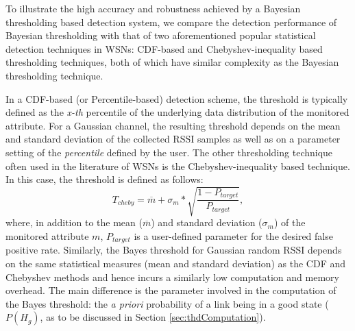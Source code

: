 
To illustrate the high accuracy and robustness achieved by a Bayesian thresholding based detection system,  we compare the detection performance of Bayesian thresholding with that of two aforementioned popular statistical detection techniques in WSNs: CDF-based and Chebyshev-inequality based thresholding techniques, both of which have similar complexity as the Bayesian thresholding technique.  

In a CDF-based (or Percentile-based) detection scheme, the threshold is typically defined as the \textit{x-th} percentile of the underlying data distribution of the monitored attribute. For a Gaussian channel, the resulting threshold depends on the mean and standard deviation of the collected RSSI samples as well as on a parameter setting of the \textit{percentile} defined by the user.  The other thresholding technique often used in the literature of WSNs is the Chebyshev-inequality based technique.
In this case, the threshold is defined as follows:
\setlength{\belowdisplayskip}{3pt} \setlength{\belowdisplayshortskip}{3pt}
\setlength{\abovedisplayskip}{3pt} \setlength{\abovedisplayshortskip}{3pt}
\begin{equation}\label{equ:chebyTHD}
T_{cheby} = \overline{m} +  \sigma_m \ast \sqrt{\frac{1-P_{target}}{P_{target}}},
\end{equation}
where, in addition to the mean ($\overline{m}$) and standard deviation ($\sigma_m$) of the monitored attribute $m$, $P_{target}$ is a user-defined parameter for the desired false positive rate. Similarly, the Bayes threshold for Gaussian random RSSI depends on the same statistical measures (mean and standard deviation) as the CDF and Chebyshev methods and hence incurs a similarly low computation and memory overhead. The main difference is the parameter involved in the computation of the Bayes threshold: the \textit{a priori} probability of a link being in a good state ($P(H_g)$, as to be discussed in Section \ref{sec:thdComputation}).

